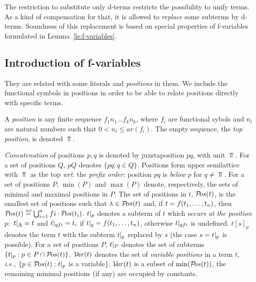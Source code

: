 The restriction to substitute only d-terms restricts the possibility to
unify terms. As a kind of compensation for that, it is allowed to {\em
replace} some subterms by d-terms.  Soundness of this replacement is based on
special properties of f-variables formulated in Lemma~\ref {le:f-variables}.
%
\subsection{Introduction of f-variables}
%
They are related with some literals and {\em positions} in them.  We include
the functional symbols in positions in order to be able to relate positions
directly with specific terms.

 \begin{DEFINITION}\label {def:position}
A {\em position} is any finite sequence \(f_1n_1\ldots f_kn_k\), where $f_i$ are functional sybols and $n_i$ are natural numbers such that \(0< n_i\leq ar(f_i)\).
The empty sequence, the {\em top position}, is denoted \(\Top\).
\end{DEFINITION}

{\em Concatenation} of positions $p,q$ is denoted by juxstaposition \(pq\),
with unit \(\Top\).  
For a set of positions $Q$, \(pQ\) denotes \(\{pq: q\in Q\}\).  
Positions form upper semilattice
with $\Top$ as the top {\it wrt}. the {\em prefix order}:
position \(pq\) is {\em below} $p$ for \(q\neq \Top\).  For a set of
positions $P$, \(\min(P)\) and \(\max(P)\) denote, respectively, the sets of
minimal and maximal positions in $P$.  The set of positions in $t$, \(\Pos
t\), is the smallest set of positions such that \(\Top \in \Pos t\) and, if
\(t=f(\List tn,)\), then \(\Pos t\Def \bigcup_{i=1}^n fi\cdot\Pos {t_i}\).
$\subterm tp$ denotes a subterm of $t$ which {\em occurs at the position} $p:$
\(\subterm t\Top= t\) and \(\subterm t{qfi}=t_i\) if \(\subterm tq=f(\List
tn,)\), otherwise \(\subterm t{qfi}\) is undefined.
$t[s]_p$ denotes the term $t$ with the
subterm \(\subterm tp\) replaced by $s$ (the case \(s=\subterm tp\) is
possible).
For a set of positions $P$, \(\subterm tP\) denotes the set of subterms
\(\{\subterm tp:p\in P\cap \Pos t\}\).
\(\Var t\) denotes the set of {\em variable positions} in a term $t$,
{\it i.e.}, \(\{p\in\Pos t:\subterm tp\) is a variable$\}$.  %
\(\Var t\) is a subset of \(\min
(\Pos t)\), the remaining minimal positions (if any) are occupied by
constants.
%
